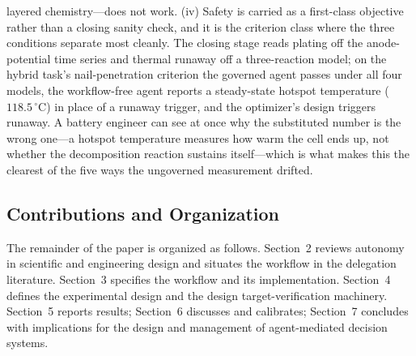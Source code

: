 layered chemistry---does not work. (iv) Safety is carried as a first-class
objective rather than a closing sanity check, and it is the criterion class
where the three conditions separate most cleanly. The closing stage reads
plating off the anode-potential time series and thermal runaway off a
three-reaction model; on the hybrid task's nail-penetration criterion the
governed agent passes under all four models, the workflow-free agent
reports a steady-state hotspot temperature ($118.5\,^\circ$C) in place of
a runaway trigger, and the optimizer's design triggers runaway. A battery
engineer can see at once why the substituted number is the wrong one---a
hotspot temperature measures how warm the cell ends up, not whether the
decomposition reaction sustains itself---which is what makes this the
clearest of the five ways the ungoverned measurement drifted.

\subsection{Contributions and Organization}

The remainder of the paper is organized as follows. Section~2 reviews autonomy
in scientific and engineering design and situates the workflow in the delegation
literature. Section~3 specifies the workflow and its implementation. Section~4
defines the experimental design and the design target-verification machinery.
Section~5 reports results; Section~6 discusses and calibrates; Section~7
concludes with implications for the design and management of agent-mediated
decision systems.
